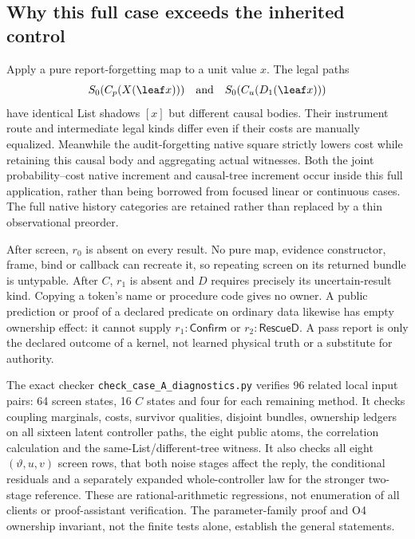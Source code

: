 \subsection{Why this full case exceeds the inherited control}
Apply a pure report-forgetting map to a unit value $x$. The legal paths
\[
S_0(C_p(X(\leaf x)))\quad\hbox{and}\quad
S_0(C_u(D_1(\leaf x)))
\]
have identical List shadows $[x]$ but different causal bodies. Their
instrument route and intermediate legal kinds differ even if their costs
are manually equalized. Meanwhile the audit-forgetting native square
strictly lowers cost while retaining this causal body and aggregating
actual witnesses. Both the joint probability--cost native increment and
causal-tree increment occur inside this full application, rather than
being borrowed from focused linear or continuous cases. The full native
history categories are retained rather than replaced by a thin
observational preorder.

After screen, $r_0$ is absent on every result. No pure map, evidence
constructor, frame, bind or callback can recreate it, so repeating screen
on its returned bundle is untypable. After $C$, $r_1$ is absent and $D$
requires precisely its uncertain-result kind. Copying a token's name or
procedure code gives no owner. A public prediction or proof of a declared
predicate on ordinary data likewise has empty ownership effect: it
cannot supply $r_1:\mathsf{Confirm}$ or $r_2:\mathsf{RescueD}$. A pass
report is only the declared outcome of a kernel, not learned physical
truth or a substitute for authority.

The exact checker \texttt{check\_case\_A\_diagnostics.py} verifies 96
related local input pairs: 64 screen states, 16 $C$ states and four for
each remaining method. It checks coupling marginals, costs, survivor
qualities, disjoint bundles, ownership ledgers on all sixteen latent
controller paths, the eight public atoms, the correlation calculation
and the same-List/different-tree witness. It also checks all eight
$(\vartheta,u,v)$ screen rows, that both noise stages affect the reply,
the conditional residuals and a separately expanded whole-controller law
for the stronger two-stage reference. These are rational-arithmetic
regressions, not enumeration of all clients or proof-assistant
verification. The parameter-family proof and O4 ownership invariant,
not the finite tests alone, establish the general statements.

